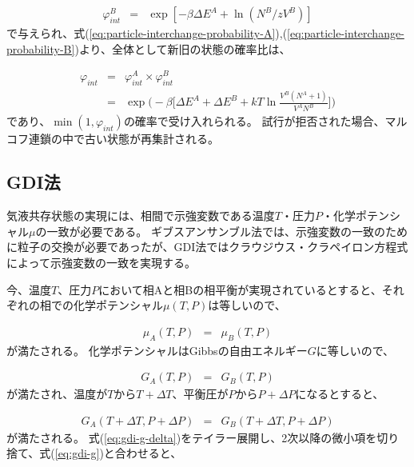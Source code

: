 \documentclass[titlepage]{jsreport}
\begin{document}
\large
\begin{eqnarray}
\varphi_{int}^B &=& \exp[-{\beta}{\Delta}E^A+\ln(N^B/zV^B)]\label{eq:particle-interchange-probability-B}
\end{eqnarray}
\normalsize
で与えられ、式(\ref{eq:particle-interchange-probability-A}),(\ref{eq:particle-interchange-probability-B})より、全体として新旧の状態の確率比は、

\large
\begin{eqnarray}
\varphi_{int} &=& \varphi_{int}^A×\varphi_{int}^B \nonumber\\
              &=& \exp\Bigg(-\beta\bigg[{\Delta}E^A+{\Delta}E^B+{kT}\ln{\frac{V^B(N^A+1)}{V^AN^B}}\bigg]\Bigg)\label{eq:particle-interchange-probability-all}
\end{eqnarray}
\normalsize
であり、$\min(1, \varphi_{int})$の確率で受け入れられる。
試行が拒否された場合、マルコフ連鎖の中で古い状態が再集計される。


\subsection{GDI法}\label{principle-subsec:gibbs-duhem-integration}
気液共存状態の実現には、相間で示強変数である温度$T$・圧力$P$・化学ポテンシャル$\mu$の一致が必要である。
ギブスアンサンブル法では、示強変数の一致のために粒子の交換が必要であったが、GDI法ではクラウジウス・クラペイロン方程式によって示強変数の一致を実現する。

今、温度$T$、圧力$P$において相Aと相Bの相平衡が実現されているとすると、それぞれの相での化学ポテンシャル$\mu(T,P)$は等しいので、

\large
\begin{eqnarray}
\mu_A(T,P) &=& \mu_B(T,P) \label{eq:gdi-mu}
\end{eqnarray}
\normalsize
が満たされる。
化学ポテンシャルはGibbsの自由エネルギー$G$に等しいので、

\large
\begin{eqnarray}
G_A(T,P) &=& G_B(T,P) \label{eq:gdi-g}
\end{eqnarray}
\normalsize
が満たされ、温度が$T$から$T+\Delta{T}$、平衡圧が$P$から$P+\Delta{P}$になるとすると、

\large
\begin{eqnarray}
G_A(T+\Delta{T},P+\Delta{P}) &=& G_B(T+\Delta{T},P+\Delta{P}) \label{eq:gdi-g-delta}
\end{eqnarray}
\normalsize
が満たされる。
式(\ref{eq:gdi-g-delta})をテイラー展開し、2次以降の微小項を切り捨て、式(\ref{eq:gdi-g})と合わせると、
\end{document}
